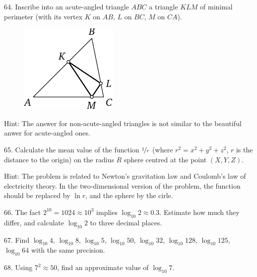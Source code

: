 \begin{problem}{64.}
	Inscribe into an acute-angled triangle $ABC$ a triangle $KLM$ of minimal perimeter
	(with its vertex $K$ on $AB$, $L$ on $BC$, $M$ on $CA$).
	\begin{figure}
		\includegraphics{taskbook-48} 
	\end{figure}

	\begin{note}{Hint:}
		The answer for non-acute-angled triangles is not similar to the beautiful anwer for acute-angled ones.
	\end{note}
\end{problem}

\begin{problem}{65.}
	Calculate the mean value of the function  $\nicefrac{1}{r}$ (where
	$r^2=x^2+y^2+z^2$, $r$ is the distance to the origin) on the radius 
	$R$ sphere centred at the point $(X,Y,Z)$.

	\begin{note}{Hint:}
		The problem is related to Newton's gravitation law and Coulomb's law of electricity theory.
		In the two-dimensional version of the problem, the function should be replaced by $\ln r$, and the sphere by the cirle.
	\end{note}
\end{problem}

\begin{problem}{66.}
	The fact $2^{10}=1024 \approx 10^3$ implies
	$\log_{10} 2 \approx 0.3$. 	Estimate how much they differ, and calculate $\log_{10} 2$ to three decimal places. 
\end{problem}

\begin{problem}{67.}
	Find $\log_{10} 4$, $\log_{10} 8$,
	$\log_{10} 5$, $\log_{10} 50$, $\log_{10} 32$, $\log_{10} 128$,
	$\log_{10} 125$, $\log_{10} 64$ with the same precision.
\end{problem}

\begin{problem}{68.} 
	Using $7^2 \approx 50$, find an approximate value of $\log_{10} 7$.
\end{problem}

